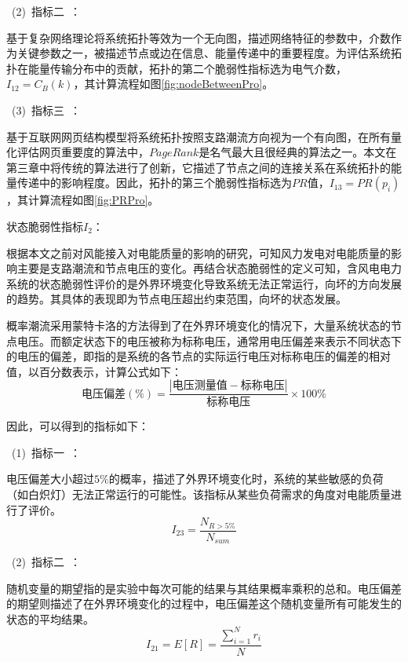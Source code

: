 ~(2)~指标二~：

基于复杂网络理论将系统拓扑等效为一个无向图，描述网络特征的参数中，介数作为关键参数之一，被描述节点或边在信息、能量传递中的重要程度。为评估系统拓扑在能量传输分布中的贡献，拓扑的第二个脆弱性指标选为电气介数，$I_{12}=C_B(k)$，其计算流程如图\ref{fig:nodeBetweenPro}。

~(3)~指标三~：

基于互联网网页结构模型将系统拓扑按照支路潮流方向视为一个有向图，在所有量化评估网页重要度的算法中，$PageRank$是名气最大且很经典的算法之一。本文在第三章中将传统的算法进行了创新，它描述了节点之间的连接关系在系统拓扑的能量传递中的影响程度。因此，拓扑的第三个脆弱性指标选为$PR$值，$I_{13}=PR(p_i)$，其计算流程如图\ref{fig:PRPro}。

状态脆弱性指标$I_2$：

根据本文之前对风能接入对电能质量的影响的研究，可知风力发电对电能质量的影响主要是支路潮流和节点电压的变化。再结合状态脆弱性的定义可知，含风电电力系统的状态脆弱性评价的是外界环境变化导致系统无法正常运行，向坏的方向发展的趋势。其具体的表现即为节点电压超出约束范围，向坏的状态发展。

概率潮流采用蒙特卡洛的方法得到了在外界环境变化的情况下，大量系统状态的节点电压。而额定状态下的电压被称为标称电压，通常用电压偏差来表示不同状态下的电压的偏差，即指的是系统的各节点的实际运行电压对标称电压的偏差的相对值，以百分数表示，计算公式如下：
\begin{equation}
\label{equ:chap4:Index1}
\mbox{电压偏差}(\%)=\frac{|\mbox{电压测量值}-\mbox{标称电压}|}{\mbox{标称电压}}\times 100\%
\end{equation}

因此，可以得到的指标如下：

~(1)~指标一~：

电压偏差大小超过$5\%$的概率，描述了外界环境变化时，系统的某些敏感的负荷（如白炽灯）无法正常运行的可能性。该指标从某些负荷需求的角度对电能质量进行了评价。
\begin{equation}
\label{equ:chap4:Index2}
I_{23}=\displaystyle\frac{N_{R>5\%}}{N_{sum}}
\end{equation}

~(2)~指标二~：

随机变量的期望指的是实验中每次可能的结果与其结果概率乘积的总和。电压偏差的期望则描述了在外界环境变化的过程中，电压偏差这个随机变量所有可能发生的状态的平均结果。
\begin{equation}
\label{equ:chap4:Index3}
I_{21}=E[R]=\displaystyle\frac{\sum_{i=1}^{N}r_i}{N}
\end{equation}

